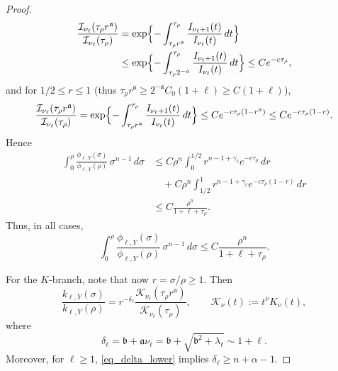 \documentclass[12pt]{amsart}
\begin{document}
\begin{proof}
\begin{align*}
\frac{\mathcal I_{\nu_\ell}(\tau_\rho r^{\mathfrak a})}{\mathcal I_{\nu_\ell}(\tau_\rho)}
&=
\exp\Bigl\{-\int_{\tau_\rho r^{\mathfrak a}}^{\tau_\rho}\frac{I_{\nu_\ell+1}(t)}{I_{\nu_\ell}(t)}\,dt\Bigr\} \\
&\le
\exp\Bigl\{-\int_{\tau_\rho 2^{-\mathfrak a}}^{\tau_\rho}\frac{I_{\nu_\ell+1}(t)}{I_{\nu_\ell}(t)}\,dt\Bigr\}
\le C e^{-c \tau_\rho},
\end{align*}
and for $1/2\le r \le 1$ (thus $\tau_\rho r^{\mathfrak a} \ge 2^{- \mathfrak a} C_0 (1+\ell) \ge C(1+\ell)$),
\begin{equation*}
\frac{\mathcal I_{\nu_\ell}(\tau_\rho r^{\mathfrak a})}{\mathcal I_{\nu_\ell}(\tau_\rho)}
=\exp\Bigl\{-\int_{\tau_\rho r^{\mathfrak a}}^{\tau_\rho}\frac{I_{\nu_\ell+1}(t)}{I_{\nu_\ell}(t)}\,dt\Bigr\}
\le C e^{-c \tau_\rho(1-r^{\mathfrak a})}
\le C e^{-c \tau_\rho(1-r)}.
\end{equation*}
Hence
\begin{align*}
   \int_0^\rho \frac{\phi_{\ell,Y}(\sigma)}{\phi_{\ell,Y}(\rho)}\,\sigma^{n-1}\,d\sigma
   &\le
    C\rho^n \int_0^{1/2} r^{n-1+\gamma_\ell} e^{-c\tau_\rho}\,dr\\
    &\quad+ C\rho^n \int_{1/2}^1 r^{n-1+\gamma_\ell}e^{-c\tau_\rho(1-r)}\,dr\\
    &\le C\frac{\rho^n}{1+\ell+\tau_\rho}.
\end{align*}
Thus, in all cases,
\begin{equation}\label{eq_I_ratio_integral_final}
    \int_0^\rho
        \frac{\phi_{\ell,Y}(\sigma)}
             {\phi_{\ell,Y}(\rho)}
    \, \sigma^{n-1} \, d\sigma
    \le
    C\frac{\rho^n}{1+\ell+\tau_\rho}.
\end{equation}

For the $K$-branch, note that now $r=\sigma/\rho \ge 1$. Then
\begin{equation}\label{eq_K_ratio}
    \frac{k_{\ell,Y}(\sigma)}
         {k_{\ell,Y}(\rho)}
    =
    r^{-\delta_\ell}
    \frac{\mathcal K_{\nu_\ell}(\tau_\rho r^{\mathfrak a})}
         {\mathcal K_{\nu_\ell}(\tau_\rho)},
    \qquad
    \mathcal K_\nu(t):=t^\nu K_\nu(t),
\end{equation}
where
\begin{equation*}
    \delta_\ell=\mathfrak b+\mathfrak a\nu_\ell =
    \mathfrak b+\sqrt{\mathfrak b^2+\lambda_\ell}
    \sim 1+\ell.
\end{equation*}
Moreover, for $\ell\ge 1$, \eqref{eq_delta_lower} implies $\delta_\ell\ge n+\alpha-1$.


\end{proof}
\end{document}
